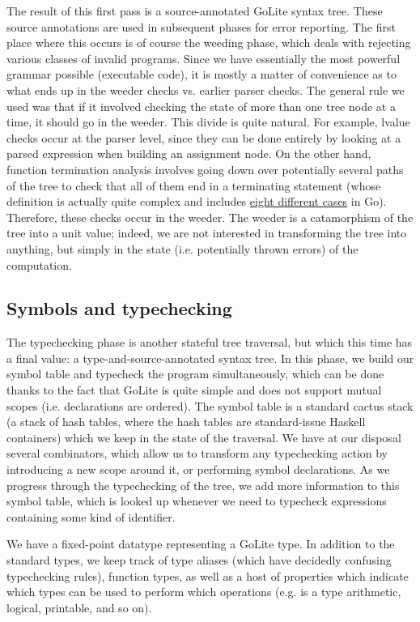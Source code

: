 \documentclass[letterpaper,11pt]{article}
\begin{document}
The result of this first pass is a source-annotated GoLite syntax tree. These source annotations are used in subsequent phases for error reporting. The first place where this occurs is of course the weeding phase, which deals with rejecting various classes of invalid programs. Since we have essentially the most powerful grammar possible (executable code), it is mostly a matter of convenience as to what ends up in the weeder checks vs. earlier parser checks. The general rule we used was that if it involved checking the state of more than one tree node at a time, it should go in the weeder. This divide is quite natural. For example, lvalue checks occur at the parser level, since they can be done entirely by looking at a parsed expression when building an assignment node. On the other hand, function termination analysis involves going down over potentially several paths of the tree to check that all of them end in a terminating statement (whose definition is actually quite complex and includes \href{https://golang.org/ref/spec#Terminating_statements}{eight different cases} in Go). Therefore, these checks occur in the weeder. The weeder is a catamorphism of the tree into a unit value; indeed, we are not interested in transforming the tree into anything, but simply in the state (i.e. potentially thrown errors) of the computation.

\subsection{Symbols and typechecking}
\label{sec:ph_type}

The typechecking phase is another stateful tree traversal, but which this time has a final value: a type-and-source-annotated syntax tree. In this phase, we build our symbol table and typecheck the program simultaneously, which can be done thanks to the fact that GoLite is quite simple and does not support mutual scopes (i.e. declarations are ordered). The symbol table is a standard cactus stack (a stack of hash tables, where the hash tables are standard-issue Haskell containers) which we keep in the state of the traversal. We have at our disposal several combinators, which allow us to transform any typechecking action by introducing a new scope around it, or performing symbol declarations. As we progress through the typechecking of the tree, we add more information to this symbol table, which is looked up whenever we need to typecheck expressions containing some kind of identifier.

We have a fixed-point datatype representing a GoLite type. In addition to the standard types, we keep track of type aliases (which have decidedly confusing typechecking rules), function types, as well as a host of properties which indicate which types can be used to perform which operations (e.g. is a type arithmetic, logical, printable, and so on).
\end{document}
